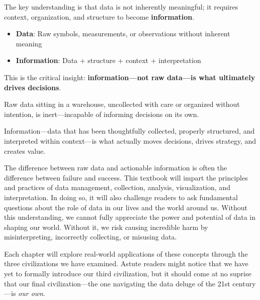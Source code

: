 The key understanding is that data is not inherently meaningful; it requires context, organization, and structure to become \textbf{information}.

\begin{definition}
\begin{itemize}
    \item \textbf{Data}: Raw symbols, measurements, or observations without inherent meaning
    \item \textbf{Information}: Data + structure + context + interpretation
\end{itemize}
\end{definition}

This is the critical insight: \textbf{information—not raw data—is what ultimately drives decisions}.

Raw data sitting in a warehouse, uncollected with care or organized without intention, is inert---incapable of informing decisions on its own.

Information---data that has been thoughtfully collected, properly structured, and interpreted within context---is what actually moves decisions, drives strategy, and creates value. 

The difference between raw data and actionable information is often the difference between failure and success.
This textbook will impart the principles and practices of data management, collection, analysis, visualization, and interpretation. 
In doing so, it will also challenge readers to ask fundamental questions about the role of data in our lives and the world around us.
Without this understanding, we cannot fully appreciate the power and potential of data in shaping our world. 
Without it, we risk causing incredible harm by misinterpreting, incorrectly collecting, or misusing data.

Each chapter will explore real-world applications of these concepts through the three civilizations we have examined. 
Astute readers might notice that we have yet to formally introduce our third civilization, but it should come at no suprise that our final civilization---the one navigating the data deluge of the 21st century---is \textit{our own}.





